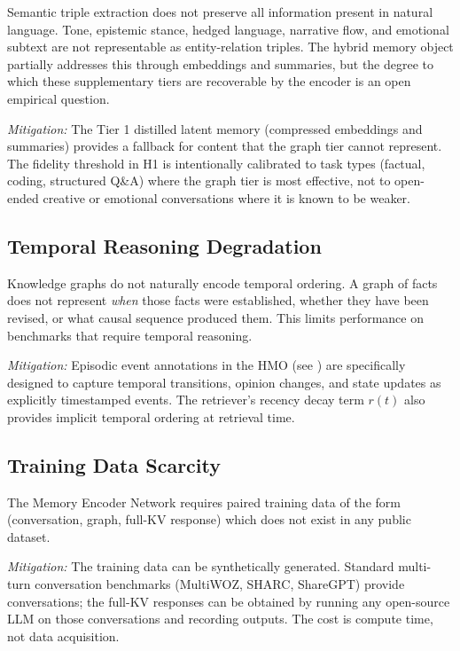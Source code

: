 \documentclass[11pt, a4paper, twoside]{article}
\theoremstyle{definition}
\begin{document}
Semantic triple extraction does not preserve all information present in natural
language. Tone, epistemic stance, hedged language, narrative flow, and emotional
subtext are not representable as entity-relation triples. The hybrid memory object
partially addresses this through embeddings and summaries, but the degree to which
these supplementary tiers are recoverable by the encoder is an open empirical
question.

\textit{Mitigation:} The Tier 1 distilled latent memory (compressed embeddings and
summaries) provides a fallback for content that the graph tier cannot represent. The
fidelity threshold in H1 is intentionally calibrated to task types (factual, coding,
structured Q\&A) where the graph tier is most effective, not to open-ended creative
or emotional conversations where it is known to be weaker.

\subsection{Temporal Reasoning Degradation}

Knowledge graphs do not naturally encode temporal ordering. A graph of facts does
not represent \textit{when} those facts were established, whether they have been
revised, or what causal sequence produced them. This limits performance on benchmarks
that require temporal reasoning.

\textit{Mitigation:} Episodic event annotations in the HMO (see )
are specifically designed to capture temporal transitions, opinion changes, and state
updates as explicitly timestamped events. The retriever's recency decay term $r(t)$
also provides implicit temporal ordering at retrieval time.

\subsection{Training Data Scarcity}

The Memory Encoder Network requires paired training data of the form (conversation,
graph, full-KV response) which does not exist in any public dataset.

\textit{Mitigation:} The training data can be synthetically generated. Standard
multi-turn conversation benchmarks (MultiWOZ, SHARC, ShareGPT) provide conversations;
the full-KV responses can be obtained by running any open-source LLM on those
conversations and recording outputs. The cost is compute time, not data acquisition.
\end{document}
